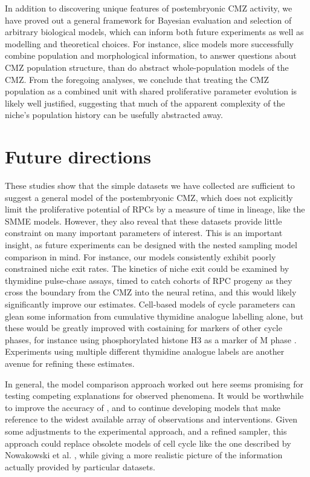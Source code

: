 In addition to discovering unique features of postembryonic CMZ activity, we have proved out a general framework for Bayesian evaluation and selection of arbitrary biological models, which can inform both future experiments as well as modelling and theoretical choices. For instance, slice models more successfully combine population and morphological information, to answer questions about CMZ population structure, than do abstract whole-population models of the CMZ. From the foregoing analyses, we conclude that treating the CMZ population as a combined unit with shared proliferative parameter evolution is likely well justified, suggesting that much of the apparent complexity of the niche's population history can be usefully abstracted away.

\section{Future directions}
These studies show that the simple datasets we have collected are sufficient to suggest a general model of the postembryonic CMZ, which does not explicitly limit the proliferative potential of RPCs by a measure of time in lineage, like the SMME models. However, they also reveal that these datasets provide little constraint on many important parameters of interest. This is an important insight, as future experiments can be designed with the nested sampling model comparison in mind. For instance, our models consistently exhibit poorly constrained niche exit rates. The kinetics of niche exit could be examined by thymidine pulse-chase assays, timed to catch cohorts of RPC progeny as they cross the boundary from the CMZ into the neural retina, and this would likely significantly improve our estimates. Cell-based models of cycle parameters can glean some information from cumulative thymidine analogue labelling alone, but these would be greatly improved with costaining for markers of other cycle phases, for instance using phosphorylated histone H3 as a marker of M phase \cite{Ren2018}. Experiments using multiple different thymidine analogue labels \cite{Harris2018} are another avenue for refining these estimates.

In general, the model comparison approach worked out here seems promising for testing competing explanations for observed phenomena. It would be worthwhile to improve the accuracy of \hyperref[chap:GMC]{}, and to continue developing models that make reference to the widest available array of observations and interventions. Given some adjustments to the experimental approach, and a refined sampler, this approach could replace obsolete models of cell cycle like the one described by Nowakowski et al. \cite{Nowakowski1989}, while giving a more realistic picture of the information actually provided by particular datasets.

